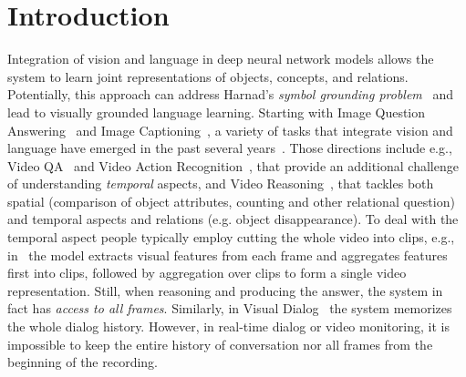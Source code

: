 \section{Introduction}

Integration of vision and language in deep neural network models allows the system to learn joint representations of objects, concepts, and relations.  Potentially, this approach can address Harnad's \textit{symbol grounding problem}~\cite{harnad2003symbol} and lead to visually grounded language learning.
Starting with Image Question Answering~\cite{malinowski2014multi,antol2015} and Image Captioning~\cite{karpathy2015deep}, a variety of tasks that integrate vision and language have emerged in the past several years~\cite{mogadala2019trends}. 
Those directions include e.g., Video QA~\cite{MovieQA} and Video Action Recognition~\cite{monfort2019moments}, that provide an additional challenge of understanding \emph{temporal} aspects, and Video Reasoning~\cite{song2018explore,yang2018dataset}, that tackles both spatial (comparison of object attributes, counting and other relational question) and temporal aspects and relations (e.g. object disappearance).
To deal with the temporal aspect people typically employ cutting the whole video into clips, e.g., in~\cite{song2018explore} the model extracts visual features from each frame and aggregates features first into clips, followed by aggregation over clips to form a single video representation.
Still, when reasoning and producing the answer, the system in fact has \textit{access to all frames}. 
Similarly, in Visual Dialog~\cite{das2017visual} the system memorizes the whole dialog history.
However, in real-time dialog or video monitoring, it is impossible to keep the entire history of conversation nor all frames from the beginning of the recording.  

